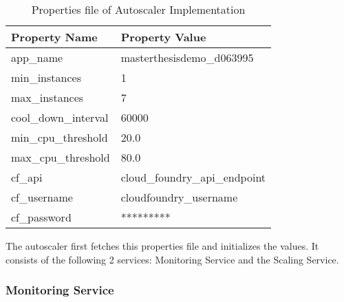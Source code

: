 \documentclass[article,type=msc,colorback,12pt,accentcolor=tud7b,table]{tudthesis}
\begin{document}
	\begin{table}[H]
		\centering
		\caption{Properties file of Autoscaler Implementation}
		\label{my-label}
		\begin{tabular}{|l|l|}
			\hline
			\rowcolor[HTML]{FFCB2F} 
			Property Name        & Property Value                \\ \hline
			app\_name            & masterthesisdemo\_d063995     \\ \hline
			min\_instances       & 1                             \\ \hline
			max\_instances       & 7                             \\ \hline
			cool\_down\_interval & 60000                         \\ \hline
			min\_cpu\_threshold  & 20.0                          \\ \hline
			max\_cpu\_threshold  & 80.0                          \\ \hline
			cf\_api              & cloud\_foundry\_api\_endpoint \\ \hline
			cf\_username         & cloudfoundry\_username           \\ \hline
			cf\_password         & *********                     \\ \hline
		\end{tabular}
	\end{table}
	
	The autoscaler first fetches this properties file and initializes the values. It consists of the following 2 services: Monitoring Service and the Scaling Service. 
	
\subsubsection{Monitoring Service}
	
\end{document}
